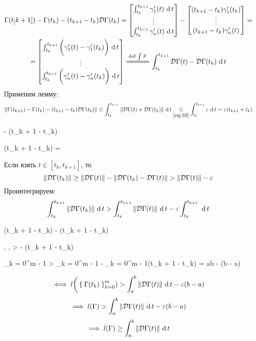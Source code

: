 \begin{iproof}
\begin{multline}
		\Gamma(t_[k + 1]) - \Gamma(t_k) - (t_{k + 1} - t_k)\mc D\Gamma(t_k) = \column{\dint[t]{t_k}{t_{k + 1}}{\gamma_1'(t)}}{\dint[t]{t_k}{t_{k + 1}}{\gamma_n'(t)}} - \column{(t_{k + 1} - t_k)\gamma_1'(t_k)}{(t_{k + 1} - t_k)\gamma_n'(t)} = \\
		= \column{\dint[t]{t_k}{t_{k + 1}}{ \bigg( \gamma_1'(t) - \gamma_1'(t_k) \bigg)}}{\dint[t]{t_k}{t_{k + 1}}{ \bigg( \gamma_n'(t) - \gamma_n'(t_k) \bigg)}} \bdefeq{\int F} \dint[t]{t_k}{t_{k + 1}}{\mc D\Gamma(t) - \mc D\Gamma(t_k)}
	\end{multline}
	Применим лемму:
	$$ \norm{\Gamma(t_{k + 1}) - \Gamma(t_k) - (t_{k + 1} - t_k)\mc D\Gamma(t_k)} \le \dint[t]{t_k}{t_{k + 1}}{\norm{\mc D\Gamma(t) + \mc D\Gamma(t_k)}} \underset{\eref{10}}\le \dint[t]{t_k}{t_{k + 1}}\veps = \veps(t_{k + 1} + t_k) $$
	\begin{equ}{13}
		\implies {} \trige {} - \veps (t_{k + 1} - t_k)
	\end{equ}
	\begin{equ}{14}
		(t_{k + 1} - t_k)  = 
	\end{equ}
	Если взять $ t \in [t_k, t_{k + 1}] $, то
	$$ \norm{\mc D \Gamma(t_k)} \ge \norm{\mc D\Gamma(t)} - \norm{\mc D\Gamma(t_k) - \mc D \Gamma(t)} > \norm{\mc D \Gamma(t)} - \veps $$
	Проинтегрируем:
	$$ \dint[t]{t_k}{t_{k + 1}}{\norm{\mc D\Gamma(t_k)}} > \dint[t]{t_k}{t_{k + 1}}{\norm{ \mc D\Gamma(t)}} - \veps \dint[t]{t_k}{t_{k + 1}}{} $$
	\begin{equ}{15}
		(t_{k + 1} - t_k)  \ge {} - \veps(t_{k + 1} - t_k)
	\end{equ}
	\begin{equ}{16}
		, ,  \implies {} >  - \veps(t_{k + 1} - t_k)
	\end{equ}
	\begin{equ}{17}
		\implies \sum_{k = 0}^{m - 1}  > \sum_{k = 0}^{m - 1}  - \veps \sum_{k = 0}^{m - 1}(t_{k + 1} - t_k) = \dint[t]ab{} - \veps(b - a)
	\end{equ}
	$$ \iff l \bigg( \seqz[m]{\Gamma(t_k)}k) > \dint[t]ab{\norm{\mc D\Gamma(t)}} - \veps(b - a) $$
	$$ \implies l(\Gamma) > \dint[t]ab{\norm{\mc D \Gamma(t)}} - \veps(b - a) $$
	$$ \implies l(\Gamma) \ge \dint[t]ab{\norm{\mc D \Gamma(t)}} $$
\end{iproof}

